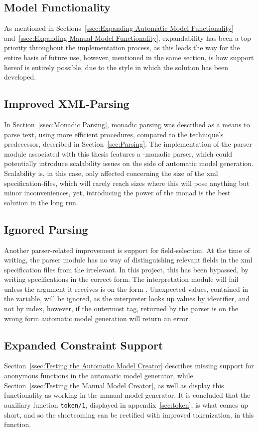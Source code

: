 \subsection{Model Functionality}
As mentioned in Sections~\ref{ssec:Expanding Automatic Model Functionality} and~\ref{ssec:Expanding Manual Model Functionality}, expandability has been a top priority throughout the implementation process, as this leads the way for the entire basis of future use, however, mentioned in the same section, is how support hereof is entirely possible, due to the style in which the solution has been developed. 
\subsection{Improved XML-Parsing}
In Section~\ref{ssec:Monadic Parsing}, monadic parsing was described as a means to parse text, using more efficient procedures, compared to the technique's predecessor, described in Section~\ref{sec:Parsing}. The implementation of the parser module associated with this thesis features a -monadic parser, which could potentially introduce scalability issues on the side of automatic model generation. Scalability is, in this case, only affected concerning the size of the xml specification-files, which will rarely reach sizes where this will pose anything but minor inconveniences, yet, introducing the power of the monad is the best solution in the long run.
\subsection{Ignored Parsing}
Another parser-related improvement is support for field-selection. At the time of writing, the parser module has no way of distinguishing relevant fields in the xml specification files from the irrelevant. In this project, this has been bypassed, by writing specifications in the correct form. The interpretation module will fail unless the argument it receives is on the form . Unexpected values, contained in the  variable, will be ignored, as the interpreter looks up values by identifier, and not by index, however, if the outermost tag, returned by the parser is on the wrong form automatic model generation will return an error.
\newpage
\subsection{Expanded Constraint Support}
Section~\ref{ssec:Testing the Automatic Model Creator} describes missing support for anonymous functions in the automatic model generator, while Section~\ref{ssec:Testing the Manual Model Creator}, as well as  display this functionality as working in the manual model generator. It is concluded that the auxiliary function \lstinline{token/1}, displayed in appendix~\ref{sec:token}, is what comes up short, and so the shortcoming can be rectified with improved tokenization, in this function.
